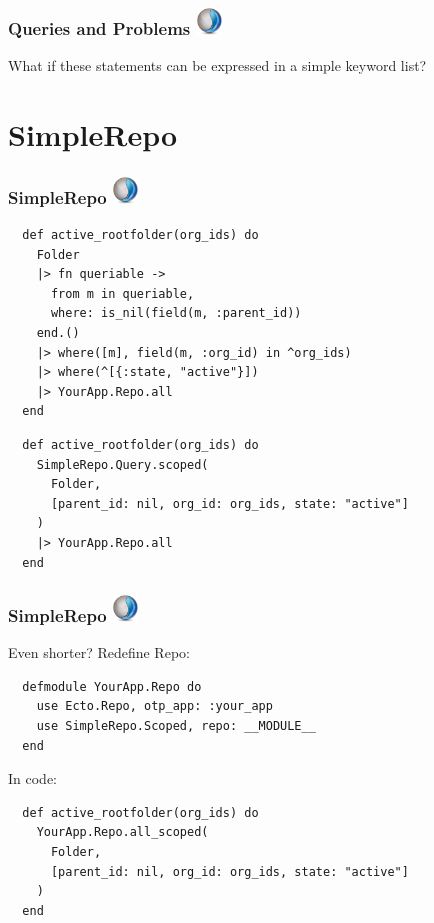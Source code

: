 \documentclass{beamer}
\begin{document}

\begin{frame}[fragile]
\frametitle{Queries and Problems \hfill \includegraphics[width=0.05\textwidth]{recogizer_logo_small.png}}
\centerline{What if these statements can be expressed in a simple keyword list?}
\end{frame}


\section{SimpleRepo} %

\begin{frame}[fragile]
\frametitle{SimpleRepo \hfill \includegraphics[width=0.05\textwidth]{recogizer_logo_small.png}}
\begin{tiny}
\begin{verbatim}
  def active_rootfolder(org_ids) do
    Folder
    |> fn queriable ->
      from m in queriable,
      where: is_nil(field(m, :parent_id))
    end.()
    |> where([m], field(m, :org_id) in ^org_ids)
    |> where(^[{:state, "active"}])
    |> YourApp.Repo.all
  end
\end{verbatim}
\end{tiny}
\begin{verbatim}
  def active_rootfolder(org_ids) do
    SimpleRepo.Query.scoped(
      Folder,
      [parent_id: nil, org_id: org_ids, state: "active"]
    )
    |> YourApp.Repo.all
  end
\end{verbatim}
\end{frame}


\begin{frame}[fragile]
\frametitle{SimpleRepo \hfill \includegraphics[width=0.05\textwidth]{recogizer_logo_small.png}}
\centerline{Even shorter? Redefine Repo:}
\begin{verbatim}
  defmodule YourApp.Repo do
    use Ecto.Repo, otp_app: :your_app
    use SimpleRepo.Scoped, repo: __MODULE__
  end
\end{verbatim}
\pause
\centerline{In code:}
\begin{verbatim}
  def active_rootfolder(org_ids) do
    YourApp.Repo.all_scoped(
      Folder,
      [parent_id: nil, org_id: org_ids, state: "active"]
    )
  end
\end{verbatim}
\end{frame}
\end{document}
